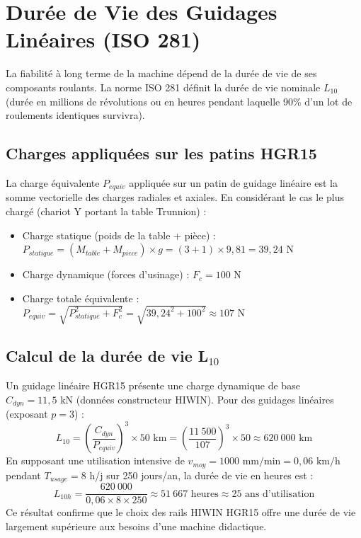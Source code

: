 \section{Durée de Vie des Guidages Linéaires (ISO 281)}

La fiabilité à long terme de la machine dépend de la durée de vie de ses composants roulants. La norme ISO 281 définit la durée de vie nominale $L_{10}$ (durée en millions de révolutions ou en heures pendant laquelle 90\% d'un lot de roulements identiques survivra).

\subsection{Charges appliquées sur les patins HGR15}
La charge équivalente $P_{equiv}$ appliquée sur un patin de guidage linéaire est la somme vectorielle des charges radiales et axiales. En considérant le cas le plus chargé (chariot Y portant la table Trunnion) :
\begin{itemize}
    \item Charge statique (poids de la table + pièce) : $P_{statique} = (M_{table} + M_{piece}) \times g = (3 + 1) \times 9{,}81 = 39{,}24 \text{ N}$
    \item Charge dynamique (forces d'usinage) : $F_c = 100 \text{ N}$
    \item Charge totale équivalente : $P_{equiv} = \sqrt{P_{statique}^2 + F_c^2} = \sqrt{39{,}24^2 + 100^2} \approx 107 \text{ N}$
\end{itemize}

\subsection{Calcul de la durée de vie L$_{10}$}
Un guidage linéaire HGR15 présente une charge dynamique de base $C_{dyn} = 11{,}5 \text{ kN}$ (données constructeur HIWIN). Pour des guidages linéaires (exposant $p = 3$) :
\begin{equation}
    L_{10} = \left(\frac{C_{dyn}}{P_{equiv}}\right)^3 \times 50 \text{ km} = \left(\frac{11~500}{107}\right)^3 \times 50 \approx \boxed{620~000 \text{ km}}
\end{equation}
En supposant une utilisation intensive de $v_{moy} = 1000 \text{ mm/min} = 0{,}06 \text{ km/h}$ pendant $T_{usage} = 8$ h/j sur 250 jours/an, la durée de vie en heures est :
\begin{equation}
    L_{10h} = \frac{620~000}{0{,}06 \times 8 \times 250} \approx \boxed{51~667 \text{ heures} \approx 25 \text{ ans d'utilisation}}
\end{equation}
Ce résultat confirme que le choix des rails HIWIN HGR15 offre une durée de vie largement supérieure aux besoins d'une machine didactique.

